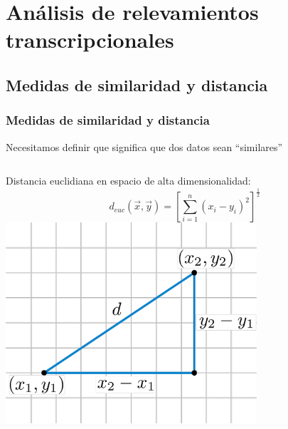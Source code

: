 \documentclass[serif,9pt, t]{beamer}
\begin{document}
\begin{frame}
\begin{columns}[T]
	\end{columns}
\end{frame}

\section{Análisis de relevamientos transcripcionales}


\subsection{Medidas de similaridad y distancia}
\begin{frame} \frametitle{Medidas de similaridad y distancia} 
\centering
Necesitamos definir que significa que dos datos sean ``similares''\bigskip
\begin{columns}[T]
	Distancia euclidiana en espacio de alta dimensionalidad:\\
	\begin{equation}
		d_{euc}(\vec{x}, \vec{y}) = [\sum\limits_{i=1}^n (x_i-y_i)^2]^\frac{1}{2}
	\end{equation}
	\bigskip
	\centering
	\includegraphics[width=0.7\textwidth]{distancia_euclidiana}


\end{columns}
\end{frame}
\end{document}

